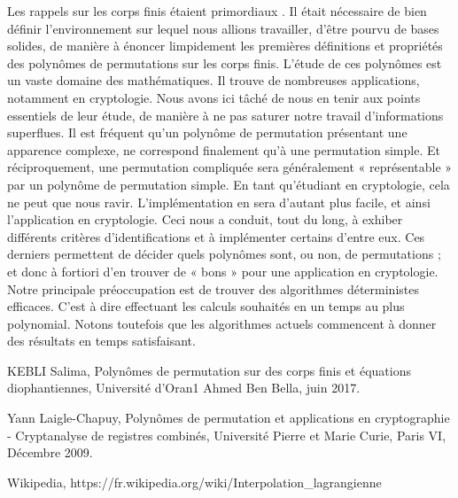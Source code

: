 \documentclass[12pt]{article}
\theoremstyle{definition}
\begin{document}
Les rappels sur les corps finis étaient primordiaux . Il était nécessaire de bien définir l'environnement sur lequel nous allions travailler, d’être pourvu de bases solides, de manière à énoncer limpidement les premières définitions et propriétés des polynômes de permutations sur les corps finis. L'étude de ces polynômes est un vaste domaine des mathématiques. Il trouve de nombreuses applications, notamment en cryptologie. Nous avons ici tâché de nous en tenir aux points essentiels de leur étude, de manière à ne pas saturer notre travail d’informations superflues. \newline
\break
Il est fréquent qu'un polynôme de permutation présentant une apparence complexe, ne correspond finalement qu’à une permutation simple. Et réciproquement, une permutation compliquée sera généralement « représentable » par un polynôme de permutation simple. En tant qu’étudiant en cryptologie, cela ne peut que nous ravir. L’implémentation en sera d’autant plus facile, et ainsi l’application en cryptologie. \newline
Ceci nous a conduit, tout du long, à exhiber différents critères d’identifications et à implémenter certains d’entre eux. Ces derniers permettent de décider quels polynômes sont, ou non, de permutations ; et donc à fortiori d'en trouver de « bons » pour une application en cryptologie. \newline
Notre principale préoccupation est de trouver des algorithmes déterministes efficaces.  C’est à dire effectuant les calculs souhaités en un temps au plus polynomial. Notons toutefois que les algorithmes actuels commencent à donner des résultats en temps satisfaisant.\\

\pagebreak



\begin{thebibliography}{9}
	KEBLI Salima,
	Polynômes de permutation sur des corps finis et équations diophantiennes,
	Université d'Oran1 Ahmed Ben Bella,
	juin 2017.

	Yann Laigle-Chapuy,
	Polynômes de permutation et applications en cryptographie - Cryptanalyse de registres combinés,
	Université Pierre et Marie Curie, Paris VI,
	Décembre 2009.

	Wikipedia,
	https://fr.wikipedia.org/wiki/Interpolation\_lagrangienne
\end{thebibliography}
\end{document}

